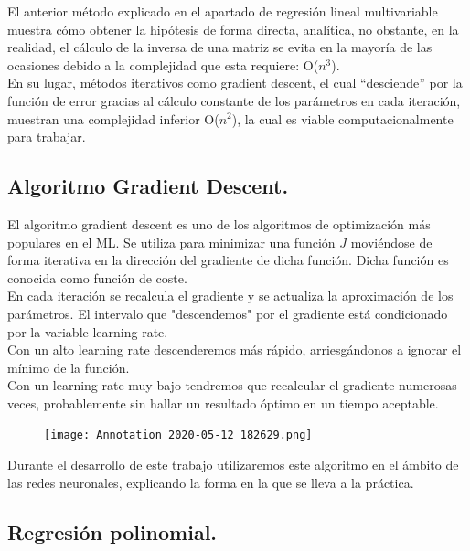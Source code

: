 \documentclass[a4paper,10pt]{article}
\begin{document}
El anterior método explicado en el apartado de regresión lineal multivariable muestra cómo obtener la hipótesis de forma directa, analítica, no obstante, en la realidad, el cálculo de la inversa de una matriz se evita en la mayoría de las ocasiones debido a la complejidad que esta requiere: O($n^3$).\\
En su lugar, métodos iterativos como gradient descent, el cual “desciende” por la función de error gracias al cálculo constante de los parámetros en cada iteración, muestran una complejidad inferior O($n^2$), la cual es viable computacionalmente para trabajar. 

\subsection{Algoritmo Gradient Descent.}
El algoritmo gradient descent es uno de los algoritmos de optimización más populares en el ML. Se utiliza para minimizar una función $J$  moviéndose de forma iterativa en la dirección del gradiente de dicha función. Dicha función es conocida como función de coste. 
\\En cada iteración se recalcula el gradiente y se actualiza la aproximación de
los parámetros.
El intervalo que "descendemos" \hspace{0.16cm}por el gradiente está condicionado por la variable learning rate. \\Con un alto learning rate descenderemos más rápido, arriesgándonos a ignorar el mínimo de la función.\\ Con un learning rate muy bajo tendremos que recalcular el gradiente numerosas veces, probablemente sin hallar un resultado óptimo en un tiempo aceptable.
\begin{figure}[H]
\centering
\texttt{[image: Annotation 2020-05-12 182629.png]}
\end{figure}

Durante el desarrollo de este trabajo utilizaremos este algoritmo en el ámbito de las redes neuronales, explicando la forma en la que se lleva a la práctica.

\subsection{Regresión polinomial.}
\end{document}
